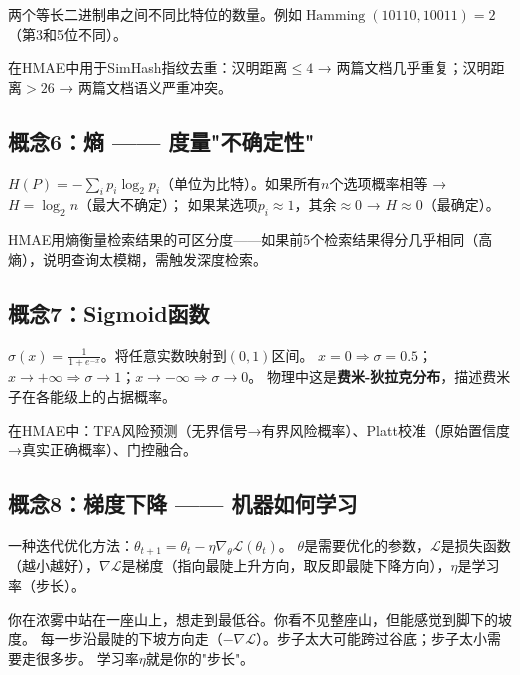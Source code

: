 \documentclass[11pt,a4paper]{ctexart}
\DeclareMathOperator{\Ham}{Hamming}
\begin{document}
\begin{defbox}
两个等长二进制串之间不同比特位的数量。例如$\Ham(10110, 10011) = 2$（第3和5位不同）。
\end{defbox}

在HMAE中用于SimHash指纹去重：汉明距离$\leq 4$ → 两篇文档几乎重复；汉明距离$> 26$ → 两篇文档语义严重冲突。

\subsection{概念6：熵 —— 度量"不确定性"}

\begin{defbox}[熵 (Entropy)]
$H(P) = -\sum_i p_i \log_2 p_i$（单位为比特）。如果所有$n$个选项概率相等 → $H = \log_2 n$（最大不确定）；
如果某选项$p_i \approx 1$，其余$\approx 0$ → $H \approx 0$（最确定）。
\end{defbox}

HMAE用熵衡量检索结果的可区分度——如果前5个检索结果得分几乎相同（高熵），说明查询太模糊，需触发深度检索。

\subsection{概念7：Sigmoid函数}

\begin{defbox}[Sigmoid函数]
$\sigma(x) = \frac{1}{1+e^{-x}}$。将任意实数映射到$(0,1)$区间。
$x=0 \Rightarrow \sigma=0.5$；$x \to +\infty \Rightarrow \sigma \to 1$；$x \to -\infty \Rightarrow \sigma \to 0$。
物理中这是\textbf{费米-狄拉克分布}，描述费米子在各能级上的占据概率。
\end{defbox}

在HMAE中：TFA风险预测（无界信号→有界风险概率）、Platt校准（原始置信度→真实正确概率）、门控融合。

\subsection{概念8：梯度下降 —— 机器如何学习}

\begin{defbox}
一种迭代优化方法：$\theta_{t+1} = \theta_t - \eta \nabla_\theta \mathcal{L}(\theta_t)$。
$\theta$是需要优化的参数，$\mathcal{L}$是损失函数（越小越好），$\nabla \mathcal{L}$是梯度（指向最陡上升方向，取反即最陡下降方向），$\eta$是学习率（步长）。
\end{defbox}

\begin{exambox}
你在浓雾中站在一座山上，想走到最低谷。你看不见整座山，但能感觉到脚下的坡度。
每一步沿最陡的下坡方向走（$-\nabla \mathcal{L}$）。步子太大可能跨过谷底；步子太小需要走很多步。
学习率$\eta$就是你的"步长"。
\end{exambox}
\end{document}

